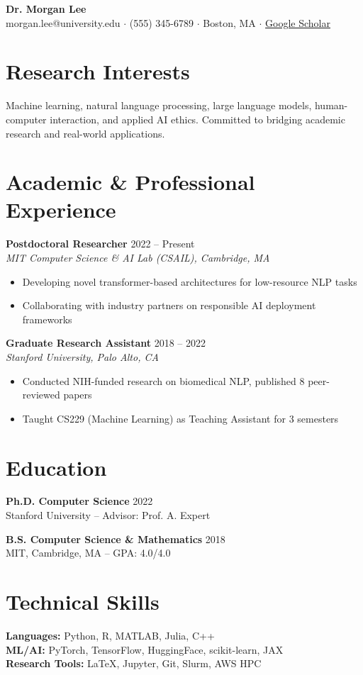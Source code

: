 \documentclass[11pt,letterpaper]{article}
\begin{document}
{\centering
  {\Large\bfseries Dr. Morgan Lee}\\[4pt]
  {\small morgan.lee@university.edu $\cdot$ (555) 345-6789 $\cdot$ Boston, MA $\cdot$ \href{https://scholar.google.com/}{Google Scholar}}
  \par
}
\vspace{6pt}

\section{Research Interests}
Machine learning, natural language processing, large language models, human-computer interaction, and applied AI ethics. Committed to bridging academic research and real-world applications.

\section{Academic \& Professional Experience}

\textbf{Postdoctoral Researcher} \hfill 2022 -- Present\\
\textit{MIT Computer Science \& AI Lab (CSAIL), Cambridge, MA}
\begin{itemize}
  \item Developing novel transformer-based architectures for low-resource NLP tasks
  \item Collaborating with industry partners on responsible AI deployment frameworks
\end{itemize}

\textbf{Graduate Research Assistant} \hfill 2018 -- 2022\\
\textit{Stanford University, Palo Alto, CA}
\begin{itemize}
  \item Conducted NIH-funded research on biomedical NLP, published 8 peer-reviewed papers
  \item Taught CS229 (Machine Learning) as Teaching Assistant for 3 semesters
\end{itemize}

\section{Education}

\textbf{Ph.D. Computer Science} \hfill 2022\\
Stanford University -- Advisor: Prof. A. Expert

\textbf{B.S. Computer Science \& Mathematics} \hfill 2018\\
MIT, Cambridge, MA -- GPA: 4.0/4.0

\section{Technical Skills}
\textbf{Languages:} Python, R, MATLAB, Julia, C++\\
\textbf{ML/AI:} PyTorch, TensorFlow, HuggingFace, scikit-learn, JAX\\
\textbf{Research Tools:} LaTeX, Jupyter, Git, Slurm, AWS HPC
\end{document}
